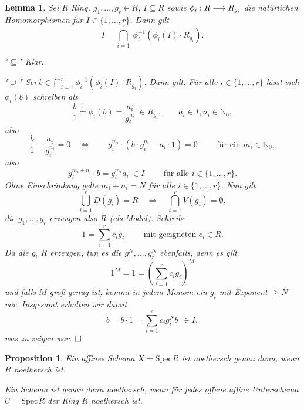 \documentclass[11pt]{book}
\newtheorem{lemma}[theorem]{Lemma}
\newtheorem{proposition}[theorem]{Proposition}
\theoremstyle{nonumberbreak}
\newenvironment{defin}[1][]{\ifthenelse{\equal{#1}{}}{\definition}{\definition[#1]}\rm}{\enddefinition}
\newenvironment{pr}[1][]{\ifthenelse{\equal{#1}{}}{\proof}{\proof[#1]}\rm}{\endproof}
\newcommand{\spec}{\mathrm{Spec} \hspace{1pt} }
\newcommand{\ideal}{\subseteq}
\begin{document}
\begin{spacing}{1.4}
\begin{defin}
\end{defin}


\begin{lemma} %
Sei $R$ Ring, $g_1, \ldots, g_r \in R$, $I \ideal R$ sowie $\phi_i: R \longrightarrow R_{g_i}$ die natürlichen Homomorphismen für $I \in \{1, \ldots, r\}$. Dann gilt
$$I = \bigcap_{i=1}^r \ \phi_i^{-1} \left( \phi_i(I) \cdot R_{g_i} \right).$$

\begin{pr}
\comp
\item["$\subseteq$"] Klar.
\item["$\supseteq$"] Sei $b \in \bigcap_{i=1}^r \phi_i^{-1}\left(\phi_i(I) \cdot R_{g_i}\right)$. Dann gilt: Für alle $i \in \{1, \ldots, r\}$ lässt sich $\phi_i(b)$ schreiben als
$$\frac{b}{1} \overset{!}{=} \phi_i(b) = \frac{a_i}{g_i^{n_i}} \ \in R_{g_i}, \qquad a_i \in I, n_i \in \mathbb{N}_0,$$
also $$\frac{b}{1} - \frac{a_i}{g_i^{n_i}} = 0 \quad \Longleftrightarrow \qquad g_i^{m_i} \cdot \left(b \cdot g_i^{n_i} - a_i \cdot 1\right) = 0 \qquad \textrm{ für ein }m_i \in \mathbb{N}_0,$$
also 
$$g_i^{m_i + n_i} \cdot b = g_i^{m_i} a_i \ \in I \qquad \textrm{ für alle } i \in \{1, \ldots, r \}.$$
Ohne Einschränkung gelte $m_i + n_i = N$ für alle $i\in \{1,\ldots, r \}$. Nun gilt 
$$\bigcup_{i=1}^r D(g_i) = R \quad \Longrightarrow \quad \bigcap_{i=1}^r V(g_i) = \emptyset,$$
die $g_1, \ldots, g_r$ erzeugen also $R$ (als Modul). Schreibe
$$1 = \sum_{i=1}^r c_i g_i \qquad \textrm{ mit geeigneten } c_i \in R.$$
Da die $g_i$ $R$ erzeugen, tun es die $g_1^N, \ldots, g_r^N$ ebenfalls, denn es gilt
$$1^M = 1 = \left( \sum_{i=1}^r c_i g_i \right)^M$$
und falls $M$ groß genug ist, kommt in jedem Monom ein $g_i$ mit Exponent $\geqslant N$ vor. Insgesamt erhalten wir damit
$$b= b \cdot 1 = \sum_{i=1}^r c_i g_i^N b \ \ \in I,$$
was zu zeigen war. $\hfill \Box$


\cend

\end{pr}

\end{lemma}


\begin{proposition}   %
\comp
\item Ein affines Schema $X=\spec R$ ist noethersch genau dann, wenn $R$ noethersch ist.
\item Ein Schema ist genau dann noethersch, wenn für jedes offene affine Unterschema $U= \spec R$ der Ring $R$ noethersch ist.
\cend
  




\end{proposition}
\end{spacing}
\end{document}
